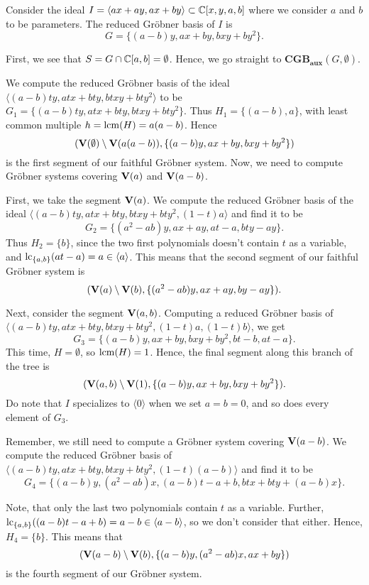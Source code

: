 \begin{example}\upshape
  Consider the ideal $I = \langle ax + ay, ax + by \rangle \subset \mathbb{C}[x, y, a, b]$ where we consider $a$ and $b$ to be parameters. The reduced Gröbner basis of $I$ is
  \[G = \{(a - b)y, ax + by, bxy + by^{2}\}.\]

  First, we see that $S = G \cap \mathbb{C}[a, b] = \emptyset$. Hence, we go straight to $\mathbf{CGB_{aux}}(G, \emptyset)$.

  We compute the reduced Gröbner basis of the ideal $\langle (a - b)ty, atx + bty, btxy + bty^{2} \rangle$ to be
  $G_{1} = \{(a - b)ty, atx + bty, btxy + bty^{2} \}$. Thus $H_{1} = \{(a - b), a\}$, with least common multiple $h = \operatorname{lcm}(H) = a(a - b)$. Hence
  \[(\operatorname{\mathbf V}(\emptyset) \setminus \operatorname{\mathbf V}(a(a - b)), \{(a - b)y, ax + by, bxy + by^{2}\})\]
  is the first segment of our faithful Gröbner system. Now, we need to compute Gröbner systems covering $\operatorname{\mathbf V}(a)$ and $\operatorname{\mathbf V}(a - b)$.

  First, we take the segment $\operatorname{\mathbf V}(a)$. We compute the reduced Gröbner basis of the ideal $\langle (a - b)ty, atx + bty, btxy + bty^{2}, (1 - t)a \rangle$ and find it to be
  \[G_{2} = \{ (a^2 - ab)y, ax + ay, at - a, bty - ay\}.\]
  Thus $H_{2} = \{b\}$, since the two first polynomials doesn't contain $t$ as a variable, and $\operatorname{lc}_{\{a, b\}}(at - a) = a \in \langle a \rangle$. This means that the second segment of our faithful Gröbner system is
  \[(\operatorname{\mathbf V}(a) \setminus \operatorname{\mathbf V}(b),\{(a^2 - ab)y, ax + ay, by - ay\} ).\]

  Next, consider the segment $\operatorname{\mathbf V}(a, b)$. Computing a reduced Gröbner basis of $\langle (a - b)ty, atx + bty, btxy + bty^{2}, (1 - t)a, (1 - t)b \rangle$, we get
  \[G_{3} = \{ (a - b)y, ax + by, bxy + by^2, bt - b, at - a\}.\]
  This time, $H = \emptyset$, so $\operatorname{lcm}(H) = 1$. Hence, the final segment along this branch of the tree is
  \[(\operatorname{\mathbf V}(a, b) \setminus \operatorname{\mathbf V}(1), \{(a - b)y, ax + by, bxy + by^2\}).\]
  Do note that $I$ specializes to $\langle 0 \rangle$ when we set $a = b = 0$, and so does every element of $G_{3}$.

  Remember, we still need to compute a Gröbner system covering $\operatorname{\mathbf V}(a - b)$. We compute the reduced Gröbner basis of $\langle (a - b)ty, atx + bty, btxy + bty^{2}, (1 - t)(a - b) \rangle$ and find it to be
  \[G_{4} = \{ (a - b)y, (a^2 - ab)x, (a - b)t - a + b, btx + bty + (a - b)x \}.\]

  Note, that only the last two polynomials contain $t$ as a variable. Further, $\operatorname{lc}_{\{a, b\}}((a - b)t - a + b) = a - b \in \langle a - b \rangle$, so we don't consider that either. Hence, $H_{4} = \{b\}$. This means that
  \[(\operatorname{\mathbf V}(a - b) \setminus \operatorname{\mathbf V}(b), \{(a - b)y, (a^2 - ab)x, ax + by \})\]
  is the fourth segment of our Gröbner system.


\end{example}
